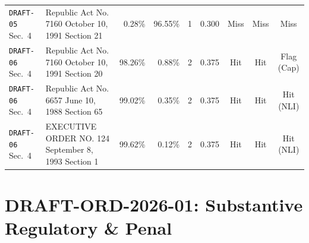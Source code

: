 \begin{landscape}
\begin{table}[p]
\begin{tabularx}{\linewidth}{@{} >{\RaggedRight\arraybackslash}p{2.9cm} >{\RaggedRight\arraybackslash}X r r c c c c c @{}}
        \texttt{DRAFT-05} Sec.~4 & Republic Act No. 7160 October 10, 1991 Section 21 & 0.28\% & 96.55\% & 1 & 0.300 & Miss & Miss & Miss \\
        \texttt{DRAFT-06} Sec.~4 & Republic Act No. 7160 October 10, 1991 Section 20 & 98.26\% & 0.88\% & 2 & 0.375 & Hit & Hit & Flag (Cap) \\
        \texttt{DRAFT-06} Sec.~4 & Republic Act No. 6657 June 10, 1988 Section 65 & 99.02\% & 0.35\% & 2 & 0.375 & Hit & Hit & Hit (NLI) \\
        \texttt{DRAFT-06} Sec.~4 & EXECUTIVE ORDER NO. 124 September 8, 1993 Section 1 & 99.62\% & 0.12\% & 2 & 0.375 & Hit & Hit & Hit (NLI) \\
        \bottomrule
    \end{tabularx}
\end{table}
\end{landscape}
\clearpage

\section{DRAFT-ORD-2026-01: Substantive Regulatory \& Penal}
\label{sec:tab_app_tier2_01}

